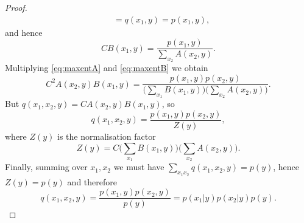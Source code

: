 \documentclass[10pt,a4paper]{amsart}
\begin{document}
\begin{proof}
\begin{equation}
\begin{aligned}
        & = q(x_1,y) = p(x_1,y),
    \end{aligned}
    \end{equation}
    and hence
    \begin{equation}
        CB(x_1,y) = \frac{p(x_1,y)}{\sum_{x_2} A(x_2,y)}. \label{eq:maxentB}
    \end{equation}
    Multiplying \eqref{eq:maxentA} and \eqref{eq:maxentB} we obtain
    \begin{equation}
        C^2 A(x_2,y) B(x_1,y) = \frac{p(x_1,y)p(x_2,y)}{\Big(\sum_{x_1} B(x_1,y)\Big)\Big(\sum_{x_2} A(x_2,y)\Big)}.
    \end{equation}
    But $q(x_1,x_2,y) = CA(x_2,y)B(x_1,y)$, so
    \begin{equation}
        q(x_1,x_2,y) = \frac{p(x_1,y)p(x_2,y)}{Z(y)},
    \end{equation}
    where $Z(y)$ is the normalisation factor
    \begin{equation}
        Z(y) = C\Big(\sum_{x_1} B(x_1,y)\Big)\Big(\sum_{x_2} A(x_2,y)\Big).
    \end{equation}
    Finally, summing over $x_1,x_2$ we must have $\sum_{x_1x_2} q(x_1,x_2,y) = p(y)$, hence $Z(y)=p(y)$ and therefore
    \begin{equation}
        q(x_1,x_2,y) = \frac{p(x_1,y)p(x_2,y)}{p(y)} = p(x_1|y)p(x_2|y)p(y).
    \end{equation}
\end{proof}
\end{document}
